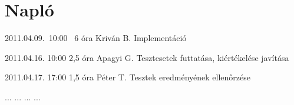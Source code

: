 %
\section{Napló}

\begin{naplo}

\bejegyzes
{2011.04.09.~10:00~} %
{6 óra} %
{Kriván B.} %
{Implementáció} %

\bejegyzes
{2011.04.16. 10:00} %
{2,5 óra} %
{Apagyi G.} %
{Tesztesetek futtatása, kiértékelése javítása} %

\bejegyzes
{2011.04.17. 17:00} %
{1,5 óra} %
{Péter T.} %
{Tesztek eredményének ellenőrzése} %


\bejegyzes
{...}
{...}
{...}
{...}


\end{naplo}

